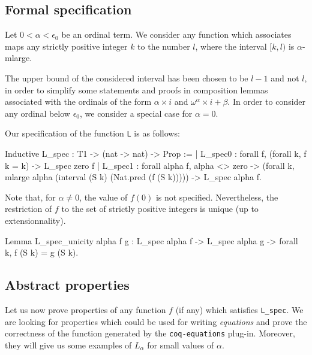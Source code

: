 \subsection{Formal specification}


Let $0<\alpha<\epsilon_0$ be an ordinal term. We consider any  function which associates maps  any strictly positive integer $k$ to the number $l$, where 
the interval $[k,l)$ is $\alpha$-mlarge.

\begin{remark}
The upper bound of the considered interval has been chosen to be  $l-1$ and not $l$, in order to simplify some statements and proofs in composition lemmas associated with the ordinals of the form $\alpha\times i$ and 
$\omega^\alpha\times i + \beta$.
In order to consider any ordinal below $\epsilon_0$, we consider a special case for $\alpha=0$.
\end{remark}




Our specification of the function \texttt{L} is as follows:

\begin{Coqsrc}
Inductive L_spec : T1 -> (nat -> nat) -> Prop :=
| L_spec0 : forall f, (forall k, f k = k) ->  L_spec zero f
| L_spec1 : forall alpha f,
    alpha <> zero ->
    (forall k, mlarge alpha (interval (S k) (Nat.pred (f (S k))))) ->
    L_spec alpha f.
\end{Coqsrc}


Note that, for $\alpha\not=0$, the value of $f(0)$ is not specified.
Nevertheless, the restriction of $f$ to the set of strictly positive integers is unique (up to extensionnality).

\begin{Coqsrc}
Lemma L_spec_unicity alpha f g :
  L_spec alpha f -> L_spec alpha g -> forall k, f (S k) = g (S k).
\end{Coqsrc}


\subsection{Abstract properties}



Let us now prove properties of any function $f$ (if any) which satisfies 
\texttt{L\_spec}. We are looking for properties which could be used for writing \emph{equations} and prove the correctness of the function generated by the \texttt{coq-equations} plug-in. Moreover, they will give us some examples of
$L_\alpha$ for small values of $\alpha$. 


